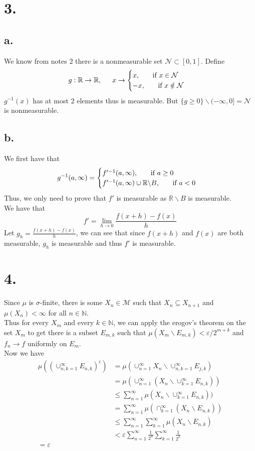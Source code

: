 \documentclass[11pt]{article}
\theoremstyle{mystyle}
\theoremstyle{definition}
\begin{document}
\section*{3.}
\subsection*{a.}
We know from notes 2 there is a nonmeasurable set $\mathcal{N} \subset [0,1]$. Define 
\[
  g: \mathbb{R} \to \mathbb{R}, \indent x \to
  \begin{cases}
    x, \indent \text{ if } x \in \mathcal{N} \\
    -x, \indent \text{ if } x \notin \mathcal{N}
  \end{cases}
\]
$g^{-1}(x)$ has at most 2 elements thus is measurable. But $\{g \ge 0\} \backslash (-\infty, 0] = \mathcal{N}$ is nonmeasurable.   
\subsection*{b.}
We first have that 
\[
  g^{-1}(a,\infty) = 
  \begin{cases}
    f'^{-1}(a,\infty), \indent \text{ if } a \ge 0 \\ 
    f'^{-1}(a,\infty) \cup \mathbb{R} \backslash B , \indent \text{ if } a < 0 \\
  \end{cases}
\]
Thus, we only need to prove that $f'$ is measurable as $\mathbb{R} \backslash B$ is measurable.\\
We have that 
\[
  f' = \lim_{h \to 0} \displaystyle\frac{f(x+h) - f(x)}{h}
\]
Let $g_h = \displaystyle\frac{f(x+h) - f(x)}{h}$, we can see that since $f(x+h)$ and $f(x)$ are both measurable, $g_h$ is measurable and thus $f'$ is measurable.
\newpage
\section*{4.}
Since $\mu$ is $\sigma$-finite, there is some $X_n \in \mathcal{M}$ such that $X_n \subseteq X_{n+1}$ and $\mu(X_n) < \infty$ for all $n \in \mathbb{N}$. \\ 
Thus for every $X_m$ and every $k \in \mathbb{N}$, we can apply the erogov's theorem on the set $X_m$ to get there is a subset $E_{m,k}$ such that $\mu(X_m \backslash E_{m,k}) < \varepsilon / 2^{m+k} $ and $f_n \to f$ uniformly on $E_m$.\\
Now we have 
\begin{align*}
  \mu((\cup_{n,k=1}^\infty E_{n,k})^c) &= \mu(\cup_{n=1}^\infty X_n \backslash \cup_{n,k=1}^\infty E_{j,k}) \\
  &= \mu( \cup_{n=1}^\infty (X_n \backslash \cup_{k=1}^\infty E_{n,k})) \\
  &\le \sum_{n=1}^\infty \mu(X_n \backslash \cup_{k=1}^\infty E_{n,k})) \\
  &= \sum_{n=1}^\infty \mu (\cap_{k=1}^\infty (X_n \backslash E_{n,k})) \\ 
  &\le \sum_{n=1}^\infty \sum_{k=1}^\infty \mu(X_n \backslash E_{n,k}) \\
  &< \varepsilon \sum_{n=1}^\infty \displaystyle\frac{1}{2^n} \sum_{k=1}^\infty \displaystyle\frac{1}{2^k} \\
  = \varepsilon
\end{align*}
\newpage
\end{document}
